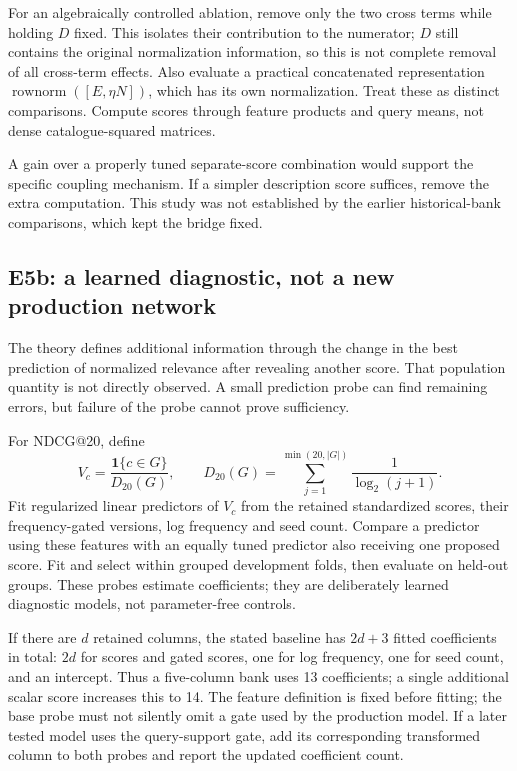\documentclass[11pt,a4paper]{article}
\newcommand{\ind}{\mathbf1}
\newcommand{\rownorm}{\operatorname{rownorm}}
\begin{document}
For an algebraically controlled ablation, remove only the two cross terms
while holding $D$ fixed. This isolates their contribution to the numerator;
$D$ still contains the original normalization information, so this is not
complete removal of all cross-term effects. Also evaluate a practical
concatenated representation $\rownorm([E,\eta N])$, which has its own
normalization. Treat these as distinct comparisons. Compute scores through
feature products and query means, not dense catalogue-squared matrices.

A gain over a properly tuned separate-score combination would support the
specific coupling mechanism. If a simpler description score suffices, remove
the extra computation. This study was not established by the earlier
historical-bank comparisons, which kept the bridge fixed.

\subsection{E5b: a learned diagnostic, not a new production network}

The theory defines additional information through the change in the best
prediction of normalized relevance after revealing another score. That
population quantity is not directly observed. A small prediction probe can
find remaining errors, but failure of the probe cannot prove sufficiency.

For NDCG@20, define
\begin{equation}
 V_c=\frac{\ind\{c\in G\}}{D_{20}(G)},\qquad
 D_{20}(G)=\sum_{j=1}^{\min(20,|G|)}\frac1{\log_2(j+1)}.
\end{equation}
Fit regularized linear predictors of $V_c$ from the retained standardized
scores, their frequency-gated versions, log frequency and seed count.
Compare a predictor using these features with an equally tuned predictor
also receiving one proposed score. Fit and select within grouped development
folds, then evaluate on held-out groups. These probes estimate coefficients;
they are deliberately learned diagnostic models, not parameter-free controls.

If there are $d$ retained columns, the stated baseline has $2d+3$ fitted
coefficients in total: $2d$ for scores and gated scores, one for log frequency,
one for seed count, and an intercept. Thus a five-column bank uses 13
coefficients; a single additional scalar score increases this to 14.
The feature definition is
fixed before fitting; the base probe must not silently omit a gate used by
the production model. If a later tested model uses the query-support gate,
add its corresponding transformed column to both probes and report the
updated coefficient count.
\end{document}
